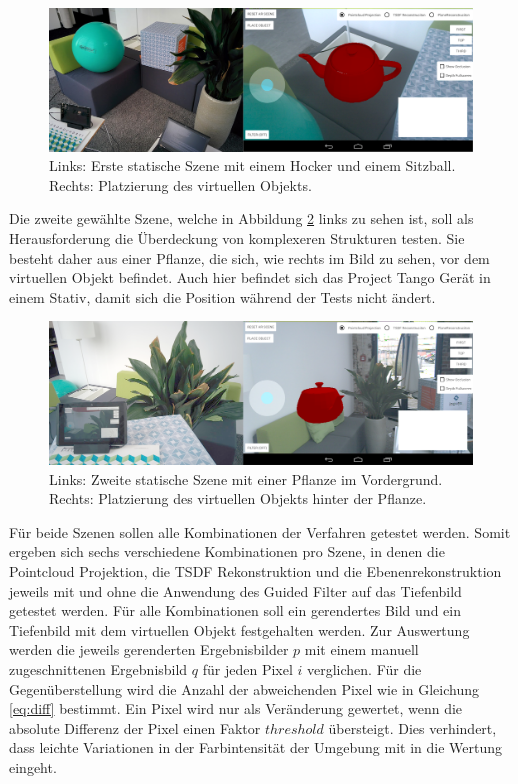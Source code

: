 \begin{figure}[h]
  \centering
	\includegraphics[width=1.0\textwidth]{content/images/evaluation/static-scene.png} 
  \caption{Links: Erste statische Szene mit einem Hocker und einem Sitzball. Rechts: Platzierung des virtuellen Objekts. }
  \label{fig:static-scene}
\end{figure}

Die zweite gewählte Szene, welche in Abbildung \ref{fig:plant-scene} links zu sehen ist, soll als Herausforderung die Überdeckung von komplexeren Strukturen testen. Sie besteht daher aus einer Pflanze, die sich, wie rechts im Bild zu sehen, vor dem virtuellen Objekt befindet. Auch hier befindet sich das Project Tango Gerät in einem Stativ, damit sich die Position während der Tests nicht ändert. 

\begin{figure}[h]
  \centering
	\includegraphics[width=1.0\textwidth]{content/images/evaluation/plant-scene.png} 
  \caption{Links: Zweite statische Szene mit einer Pflanze im Vordergrund. Rechts: Platzierung des virtuellen Objekts hinter der Pflanze. }
  \label{fig:plant-scene}
\end{figure}

Für beide Szenen sollen alle Kombinationen der Verfahren getestet werden. Somit ergeben sich sechs verschiedene Kombinationen pro Szene, in denen die Pointcloud Projektion, die TSDF Rekonstruktion und die Ebenenrekonstruktion jeweils mit und ohne die Anwendung des Guided Filter auf das Tiefenbild getestet werden. Für alle Kombinationen soll ein gerendertes Bild und ein Tiefenbild mit dem virtuellen Objekt festgehalten werden. Zur Auswertung werden die jeweils gerenderten Ergebnisbilder \(p\) mit einem manuell zugeschnittenen Ergebnisbild  \(q\) für jeden Pixel \(i\) verglichen. Für die Gegenüberstellung wird die Anzahl der abweichenden Pixel wie in Gleichung \ref{eq:diff} bestimmt. Ein Pixel wird nur als Veränderung gewertet, wenn die absolute Differenz der Pixel einen Faktor \(threshold\) übersteigt. Dies verhindert, dass leichte Variationen in der Farbintensität der Umgebung mit in die Wertung eingeht.

